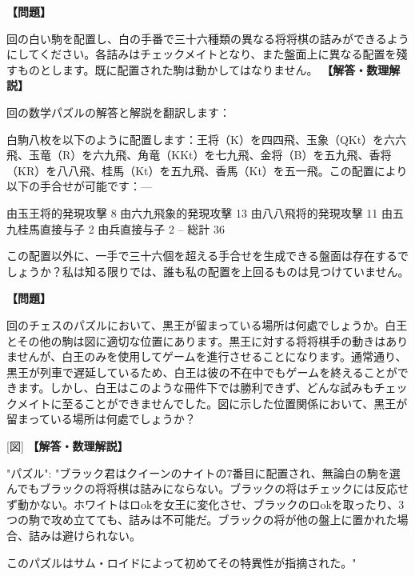 \documentclass[10pt,a4paper,oneside,openany]{ltjsbook}
\begin{document}
\begin{tcolorbox}[colback=softblue,colframe=primaryblue,title=\textbf{第 353 問：THIRTY-SIX MATES.},arc=2mm,boxrule=1pt,breakable]
\textbf{【問題】}\par\vspace{0.3em}
回の白い駒を配置し、白の手番で三十六種類の異なる将将棋の詰みができるようにしてください。各詰みはチェックメイトとなり、また盤面上に異なる配置を殘すものとします。既に配置された駒は動かしてはなりません。
\tcblower
\textbf{【解答・数理解説】}\par\vspace{0.3em}
回の数学パズルの解答と解説を翻訳します：

白駒八枚を以下のように配置します：王将（K）を四四飛、玉象（QKt）を六六飛、玉竜（R）を六九飛、角竜（KKt）を七九飛、金将（B）を五九飛、香将（KR）を八八飛、桂馬（Kt）を五九飛、香馬（Kt）を五一飛。この配置により以下の手合せが可能です：—

    由玉王将的発現攻擊             8
    由六九飛象的発現攻擊          13
    由八八飛将的発現攻擊          11
    由五九桂馬直接与子            2
    由兵直接与子                  2
                                  --
       総計                        36

この配置以外に、一手で三十六個を超える手合せを生成できる盤面は存在するでしょうか？私は知る限りでは、誰も私の配置を上回るものは見つけていません。
\end{tcolorbox}

\begin{tcolorbox}[colback=softblue,colframe=primaryblue,title=\textbf{第 354 問：AN AMAZING DILEMMA.},arc=2mm,boxrule=1pt,breakable]
\textbf{【問題】}\par\vspace{0.3em}
回のチェスのパズルにおいて、黒王が留まっている場所は何處でしょうか。白王とその他の駒は図に適切な位置にあります。黒王に対する将将棋手の動きはありませんが、白王のみを使用してゲームを進行させることになります。通常通り、黒王が列車で遅延しているため、白王は彼の不在中でもゲームを終えることができます。しかし、白王はこのような冊件下では勝利できず、どんな試みもチェックメイトに至ることができませんでした。図に示した位置関係において、黒王が留まっている場所は何處でしょうか？

[図]
\tcblower
\textbf{【解答・数理解説】}\par\vspace{0.3em}
{
"パズル": "ブラック君はクイーンのナイトの7番目に配置され、無論白の駒を選んでもブラックの将将棋は詰みにならない。ブラックの将はチェックには反応せず動かない。ホワイトはロokを女王に変化させ、ブラックのロokを取ったり、3つの駒で攻め立てても、詰みは不可能だ。ブラックの将が他の盤上に置かれた場合、詰みは避けられない。

このパズルはサム・ロイドによって初めてその特異性が指摘された。"
}
\end{tcolorbox}
\end{document}
